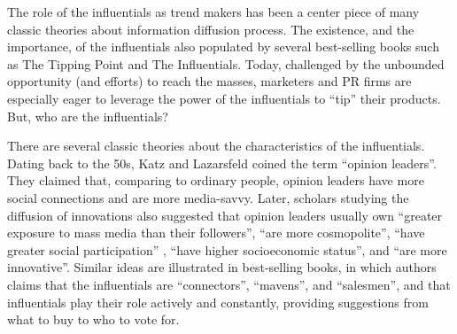 \documentclass[phd,tocprelim]{cornell}
\begin{document}


The role of the influentials as trend makers has been a center piece of many classic theories about information diffusion process\cite{katz_lazarsfeld,rogers-2003}. The existence, and the importance, of the influentials also populated by several best-selling books such as The Tipping Point\cite{Gladwell:2002} and The Influentials\cite{keller_berry}. Today, challenged by the unbounded opportunity (and efforts) to reach the masses, marketers and PR firms are especially eager to leverage the power of the influentials to ``tip'' their products. But, who are the influentials? 

There are several classic theories about the characteristics of the influentials. Dating back to the 50s, Katz and Lazarsfeld coined the term ``opinion leaders''. They claimed that, comparing to ordinary people, opinion leaders have more social connections and are more media-savvy\cite{katz_lazarsfeld}. Later, scholars studying the diffusion of innovations also suggested that opinion leaders usually own ``greater exposure to mass media than their followers'', ``are more cosmopolite'', ``have greater social participation'' , ``have higher socioeconomic status'', and ``are more innovative''\cite{rogers-2003}. Similar ideas are illustrated in best-selling books, in which authors claims that the influentials are ``connectors'', ``mavens'', and ``salesmen''\cite{gladwell}, and that influentials play their role actively and constantly, providing suggestions from what to buy to who to vote for\cite{keller_berry}.
\end{document}
